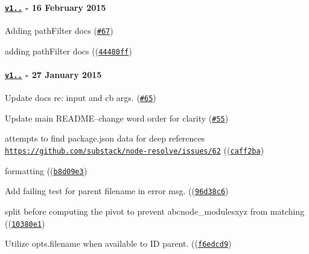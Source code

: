 \paragraph*{\href{https://github.com/browserify/resolve/compare/v1.1.0...v1.1.2}{\tt v1..} -\/ 16 February 2015}


\begin{DoxyItemize}
\item Adding path\+Filter docs (\href{https://github.com/browserify/resolve/pull/67}{\tt {\ttfamily \#67}})
\item adding path\+Filter docs ((\href{https://github.com/browserify/resolve/commit/44480ff041f791f32b80d212302180be210901a1}{\tt {\ttfamily 44480ff}})
\end{DoxyItemize}

\paragraph*{\href{https://github.com/browserify/resolve/compare/v1.0.0...v1.1.0}{\tt v1..} -\/ 27 January 2015}


\begin{DoxyItemize}
\item Update docs re\+: input and cb args. (\href{https://github.com/browserify/resolve/pull/65}{\tt {\ttfamily \#65}})
\item Update main R\+E\+A\+D\+ME--change word order for clarity (\href{https://github.com/browserify/resolve/pull/55}{\tt {\ttfamily \#55}})
\item attempts to find package.\+json data for deep references \href{https://github.com/substack/node-resolve/issues/62}{\tt https\+://github.\+com/substack/node-\/resolve/issues/62} ((\href{https://github.com/browserify/resolve/commit/caff2ba60dc5d85eaded388dc6025afd05ba183b}{\tt {\ttfamily caff2ba}})
\item formatting ((\href{https://github.com/browserify/resolve/commit/b8d09e3a2d679f6b61515d49eca3f6d8d0d2ac7f}{\tt {\ttfamily b8d09e3}})
\item Add failing test for parent filename in error msg. ((\href{https://github.com/browserify/resolve/commit/96d38c6aaa575d12781c28b34243b4939359a335}{\tt {\ttfamily 96d38c6}})
\item split before computing the pivot to prevent abcnode\+\_\+modulesxyz from matching ((\href{https://github.com/browserify/resolve/commit/10380e16d3cf03f25941c3f1545ef73ed11bc1e1}{\tt {\ttfamily 10380e1}})
\item Utilize opts.\+filename when available to ID parent. ((\href{https://github.com/browserify/resolve/commit/f6edcd95ad5d27bfbdee0fa51951aa3d45d77cba}{\tt {\ttfamily f6edcd9}})
\end{DoxyItemize}

